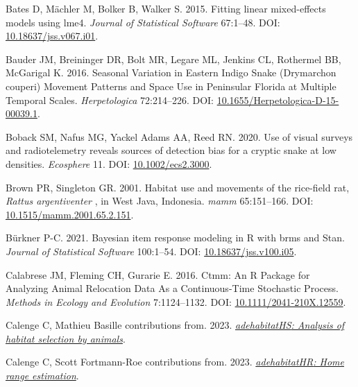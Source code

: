 \documentclass[10pt,a4paper]{article}
\newlength{\cslhangindent}
\newenvironment{CSLReferences}[2] %
 {\begin{list}{}{%
  \setlength{\itemindent}{0pt}
  \setlength{\leftmargin}{0pt}
  \setlength{\parsep}{0pt}
  \ifodd #1
   \setlength{\leftmargin}{\cslhangindent}
   \setlength{\itemindent}{-1\cslhangindent}
  \fi
  \setlength{\itemsep}{#2\baselineskip}}}
 {\end{list}}
\begin{document}
\begin{CSLReferences}{1}{0}
Bates D, Mächler M, Bolker B, Walker S. 2015. Fitting linear mixed-effects models using {lme4}. \emph{Journal of Statistical Software} 67:1--48. DOI: \href{https://doi.org/10.18637/jss.v067.i01}{10.18637/jss.v067.i01}.

Bauder JM, Breininger DR, Bolt MR, Legare ML, Jenkins CL, Rothermel BB, McGarigal K. 2016. Seasonal {Variation} in {Eastern} {Indigo} {Snake} ({Drymarchon} couperi) {Movement} {Patterns} and {Space} {Use} in {Peninsular} {Florida} at {Multiple} {Temporal} {Scales}. \emph{Herpetologica} 72:214--226. DOI: \href{https://doi.org/10.1655/Herpetologica-D-15-00039.1}{10.1655/Herpetologica-D-15-00039.1}.

Boback SM, Nafus MG, Yackel Adams AA, Reed RN. 2020. Use of visual surveys and radiotelemetry reveals sources of detection bias for a cryptic snake at low densities. \emph{Ecosphere} 11. DOI: \href{https://doi.org/10.1002/ecs2.3000}{10.1002/ecs2.3000}.

Brown PR, Singleton GR. 2001. Habitat use and movements of the rice-field rat, \emph{{Rattus} argentiventer} , in {West} {Java}, {Indonesia}. \emph{mamm} 65:151--166. DOI: \href{https://doi.org/10.1515/mamm.2001.65.2.151}{10.1515/mamm.2001.65.2.151}.

Bürkner P-C. 2021. Bayesian item response modeling in {R} with {brms} and {Stan}. \emph{Journal of Statistical Software} 100:1--54. DOI: \href{https://doi.org/10.18637/jss.v100.i05}{10.18637/jss.v100.i05}.

Calabrese JM, Fleming CH, Gurarie E. 2016. Ctmm: An {R} {Package} for {Analyzing} {Animal} {Relocation} {Data} {As} a {Continuous}-{Time} {Stochastic} {Process}. \emph{Methods in Ecology and Evolution} 7:1124--1132. DOI: \href{https://doi.org/10.1111/2041-210X.12559}{10.1111/2041-210X.12559}.

Calenge C, Mathieu Basille contributions from. 2023. \emph{\href{https://CRAN.R-project.org/package=adehabitatHS}{{adehabitatHS}: Analysis of habitat selection by animals}}.

Calenge C, Scott Fortmann-Roe contributions from. 2023. \emph{\href{https://CRAN.R-project.org/package=adehabitatHR}{{adehabitatHR}: Home range estimation}}.


\end{CSLReferences}
\end{document}
